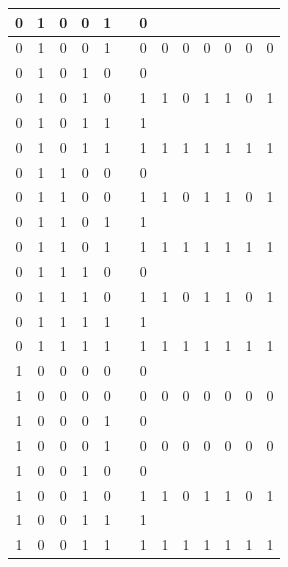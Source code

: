 \begin{table}[!tb]
\begin{tabular}{|c|c|c|c|c|c|c|c|c|c|c|c|c|}
        \rowcolor{yellow!40} 0 & 1 & 0 & 0 & 1 &  & 0 &  &  &  &  &  &  \\ \hline
        \rowcolor{yellow!40} 0 & 1 & 0 & 0 & 1 &  & 0 & 0 & 0 & 0 & 0 & 0 & 0 \\ \hline
        \rowcolor{gray!40} 0 & 1 & 0 & 1 & 0 &  & 0 &  &  &  &  &  &  \\ \hline
        \rowcolor{gray!40} 0 & 1 & 0 & 1 & 0 &  & 1 & 1 & 0 & 1 & 1 & 0 & 1 \\ \hline
        \rowcolor{blue!40} 0 & 1 & 0 & 1 & 1 &  & 1 &  &  &  &  &  &  \\ \hline
        \rowcolor{blue!40} 0 & 1 & 0 & 1 & 1 &  & 1 & 1 & 1 & 1 & 1 & 1 & 1 \\ \hline
        \rowcolor{red!40} 0 & 1 & 1 & 0 & 0 &  & 0 &  &  &  &  &  &  \\ \hline
        \rowcolor{red!40} 0 & 1 & 1 & 0 & 0 &  & 1 & 1 & 0 & 1 & 1 & 0 & 1 \\ \hline
        \rowcolor{green!40} 0 & 1 & 1 & 0 & 1 &  & 1 &  &  &  &  &  &  \\ \hline
        \rowcolor{green!40} 0 & 1 & 1 & 0 & 1 &  & 1 & 1 & 1 & 1 & 1 & 1 & 1 \\ \hline
        \rowcolor{yellow!40} 0 & 1 & 1 & 1 & 0 &  & 0 &  &  &  &  &  &  \\ \hline
        \rowcolor{yellow!40} 0 & 1 & 1 & 1 & 0 &  & 1 & 1 & 0 & 1 & 1 & 0 & 1 \\ \hline
        \rowcolor{gray!40} 0 & 1 & 1 & 1 & 1 &  & 1 &  &  &  &  &  &  \\ \hline
        \rowcolor{gray!40} 0 & 1 & 1 & 1 & 1 &  & 1 & 1 & 1 & 1 & 1 & 1 & 1 \\ \hline
        \rowcolor{blue!40} 1 & 0 & 0 & 0 & 0 &  & 0 &  &  &  &  &  &  \\ \hline
        \rowcolor{blue!40} 1 & 0 & 0 & 0 & 0 &  & 0 & 0 & 0 & 0 & 0 & 0 & 0 \\ \hline
        \rowcolor{red!40} 1 & 0 & 0 & 0 & 1 &  & 0 &  &  &  &  &  &  \\ \hline
        \rowcolor{red!40} 1 & 0 & 0 & 0 & 1 &  & 0 & 0 & 0 & 0 & 0 & 0 & 0 \\ \hline
        \rowcolor{green!40} 1 & 0 & 0 & 1 & 0 &  & 0 &  &  &  &  &  &  \\ \hline
        \rowcolor{green!40} 1 & 0 & 0 & 1 & 0 &  & 1 & 1 & 0 & 1 & 1 & 0 & 1 \\ \hline
        \rowcolor{yellow!40} 1 & 0 & 0 & 1 & 1 &  & 1 &  &  &  &  &  &  \\ \hline
        \rowcolor{yellow!40} 1 & 0 & 0 & 1 & 1 &  & 1 & 1 & 1 & 1 & 1 & 1 & 1 \\ \hline

\end{tabular}
\end{table}
